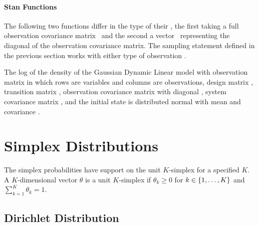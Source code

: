 
\subsubsection{Stan Functions}

The following two functions differ in the type of their , the
first taking a full observation covariance matrix \ and the
second a vector \ representing the diagonal of the observation
covariance matrix.  The sampling statement defined in the previous
section works with either type of observation .

\begin{description}
%
%
%
 {The log of the density of the Gaussian Dynamic
  Linear model with observation matrix  in which rows are
  variables and columns are observations, design matrix ,
  transition matrix , observation covariance matrix with
  diagonal , system covariance matrix , and the
  initial state is distributed normal with mean  and
  covariance .}
%
\end{description}


\chapter{Simplex Distributions}

\noindent
The simplex probabilities have support on the unit $K$-simplex for a
specified $K$.  A $K$-dimensional vector $\theta$ is a unit
$K$-simplex if $\theta_k \geq 0$ for $k \in \setlist{1,\ldots,K}$ and
$\sum_{k = 1}^K \theta_k = 1$.


\section{Dirichlet Distribution}

